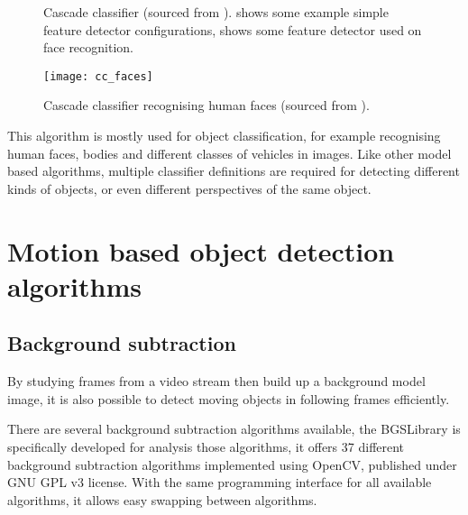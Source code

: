 \begin{figure}[H]
  \centering
  \caption{Cascade classifier (sourced from \cite{borovicka2003circle}).  shows some example simple feature detector configurations,  shows some feature detector used on face recognition.}
  \label{bg:cc}
\end{figure}

\begin{figure}[H]
  \centering
  \texttt{[image: cc\_faces]}
  \caption{Cascade classifier recognising human faces (sourced from \cite{borovicka2003circle}).}
  \label{cc:faces}
\end{figure}

This algorithm is mostly used for object classification, for example recognising human faces, bodies and different classes of vehicles in images. Like other model based algorithms, multiple classifier definitions are required for detecting different kinds of objects, or even different perspectives of the same object.


\section{Motion based object detection algorithms}

\subsection{Background subtraction}
\label{motion_bs}

By studying frames from a video stream then build up a background model image, it is also possible to detect moving objects in following frames efficiently.





There are several background subtraction algorithms available, the BGSLibrary \cite{bgslibrary} is specifically developed for analysis those algorithms, it offers 37 different background subtraction algorithms implemented using OpenCV, published under GNU GPL v3 license. With the same programming interface for all available algorithms, it allows easy swapping between algorithms.

